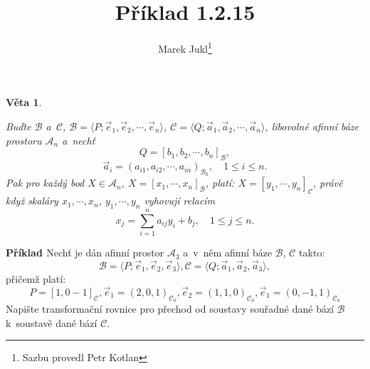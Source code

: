 \documentclass[a4paper, 12pt]{article}
\newtheorem{thm}{Věta}
\begin{document}
\title{Příklad 1.2.15}
\author{Marek Jukl\thanks{Sazbu provedl Petr Kotlan}}
\maketitle

\vspace{4cm}
\noindent \begin{tcolorbox}[colback=white, left=2pt, right=2pt, arc=0pt, outer arc=0pt,
		before upper={\begin{minipage}{1\textwidth}}, after upper={\end{minipage}}]
	\begin{thm}
		\begin{flushleft}
			\cite[str. 29]{jukl}
			\quad Buďte $\mathcal{B}$ a~$\mathcal{C}$, $\mathcal{B} = \langle P;\vec{e}_1,\vec{e}_2,\cdots,\vec{e}_n\rangle$, $\mathcal{C} = \langle Q;\vec{a}_1,\vec{a}_2,\cdots,\vec{a}_n\rangle$, libovolné afinní báze prostoru $\mathcal{A}_n$ a~nechť $$Q=[b_1, b_2, \cdots, b_n]_{\mathcal{B}},$$ $$\vec{a}_i=(a_{i1}, a_{i2}, \cdots, a_{in})_{\mathcal{B}_0},\quad 1 \leq i \leq n.$$ Pak pro každý bod $X \in \mathcal{A}_n$, $X=[x_1, \cdots, x_n]_{\mathcal{B}}$, platí: $X=[y_1, \cdots, y_n]_{\mathcal{C}}$, právě když skaláry $x_1, \cdots, x_n$, $y_1, \cdots, y_n$ vyhovují relacím $$x_j=\sum_{i=1}^{n} a_{ij}y_i+b_j,\quad 1 \leq j \leq n.$$
		\end{flushleft}
		\label{1.2.11}
	\end{thm}
\end{tcolorbox}
\vspace*{\fill}


\pagebreak

\noindent \begin{tcolorbox}[colback=white, left=2pt, right=2pt, arc=0pt, outer arc=0pt,
	before upper={\begin{minipage}{1\textwidth}}, after upper={\end{minipage}}]
	\begin{flushleft}
		\textbf{Příklad \cite[str. 31--32]{jukl}}
		Nechť je dán afinní prostor $\mathcal{A}_3$ a~v~něm afinní báze $\mathcal{B}$, $\mathcal{C}$ takto: $$\mathcal{B}=\langle P;\vec{e}_1,\vec{e}_2,\vec{e}_3\rangle, \mathcal{C}=\langle Q;\vec{a}_1,\vec{a}_2,\vec{a}_3\rangle,$$ \noindent přičemž platí: $$P=[1,0-1]_{\mathcal{C}}, \vec{e}_1=(2,0,1)_{\mathcal{C}_0}, \vec{e}_2=(1,1,0)_{\mathcal{C}_0}, \vec{e}_1=(0,-1,1)_{\mathcal{C}_0}$$ \noindent Napište transformační rovnice pro přechod od soustavy souřadné dané bází $\mathcal{B}$ k~soustavě dané bází $\mathcal{C}$.
	\end{flushleft}
\end{tcolorbox}
\end{document}
